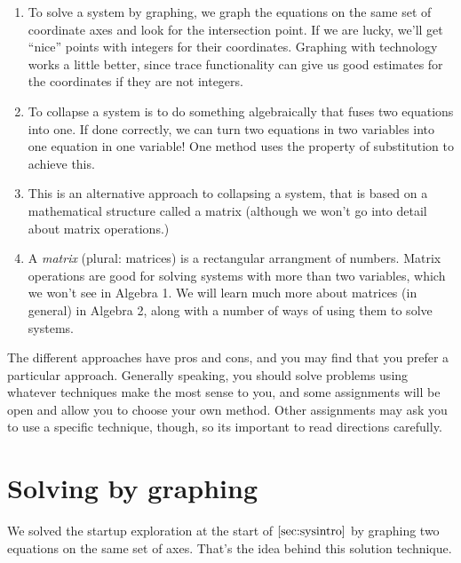 \begin{enumerate}
\item {} To solve a system by graphing, we graph the equations on the same set of coordinate axes and look for the intersection point. If we are lucky, we'll get ``nice'' points with integers for their coordinates. Graphing with technology works a little better, since trace functionality can give us good estimates for the coordinates if they are not integers.

\item {} To collapse a system is to do something algebraically that fuses two equations into one. If done correctly, we can turn two equations in two variables into one equation in one variable! One method uses the property of substitution to achieve this.

\item {} This is an alternative approach to collapsing a system, that is based on a mathematical structure called a matrix (although we won't go into detail about matrix operations.)

\item {} A \textit{matrix} (plural: matrices) is a rectangular arrangment of numbers. Matrix operations are good for solving systems with more than two variables, which we won't see in Algebra 1. We will learn much more about matrices (in general) in Algebra 2, along with a number of ways of using them to solve systems.
\end{enumerate}

The different approaches have pros and cons, and you may find that you prefer a particular approach. Generally speaking, you should solve problems using whatever techniques make the most sense to you, and some assignments will be open and allow you to choose your own method. Other assignments may ask you to use a specific technique, though, so its important to read directions carefully.

\section{Solving by graphing}
\label{sec:sysgraphing}


We solved the startup exploration at the start of $\cref{sec:sysintro}$ by graphing two equations on the same set of axes. That's the idea behind this solution technique.

